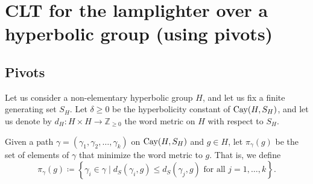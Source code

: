 \section{CLT for the lamplighter over a hyperbolic group (using pivots)}

%
%

\subsection{Pivots}
Let us consider a non-elementary hyperbolic group $H$, and let us fix a finite generating set $S_H$. Let $\delta\ge 0$ be the hyperbolicity constant of $\mathrm{Cay}(H,S_H)$, and let us denote by $d_H:H\times H\to \mathbb{Z}_{\ge 0}$ the word metric on $H$ with respect to $S_H$.

\begin{defin}
	Given a path $\gamma=(\gamma_1,\gamma_2,\ldots,\gamma_k)$ on $\mathrm{Cay}(H,S_H)$ and $g\in H$, let $\pi_{\gamma}(g)$ be the set of elements of $\gamma$ that minimize the word metric to $g$. That is, we define
	\begin{equation}
		\pi_{\gamma}(g)\coloneqq \left\{ \gamma_i \in \gamma \mid  d_S(\gamma_i,g)\le d_S(\gamma_j,g) \text{ for all }j=1,\ldots,k \right \}.
	\end{equation}
\end{defin}

